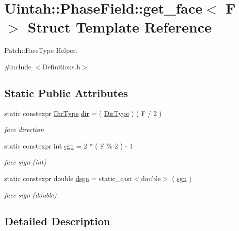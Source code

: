 \hypertarget{structUintah_1_1PhaseField_1_1get__face}{}\section{Uintah\+:\+:Phase\+Field\+:\+:get\+\_\+face$<$ F $>$ Struct Template Reference}
\label{structUintah_1_1PhaseField_1_1get__face}


Patch\+::\+Face\+Type Helper.  




{\ttfamily \#include $<$Definitions.\+h$>$}

\subsection*{Static Public Attributes}
\begin{DoxyCompactItemize}
\item 
static constexpr \hyperlink{namespaceUintah_1_1PhaseField_a94555da848596a419ae2c0e32649e1dc}{Dir\+Type} \hyperlink{structUintah_1_1PhaseField_1_1get__face_ad9ba7a557252042a35b38103270ab337}{dir} = ( \hyperlink{namespaceUintah_1_1PhaseField_a94555da848596a419ae2c0e32649e1dc}{Dir\+Type} ) ( F / 2 )
\begin{DoxyCompactList}\small\item\em face direction \end{DoxyCompactList}\item 
static constexpr int \hyperlink{structUintah_1_1PhaseField_1_1get__face_a55e98edca4379a745b28aa34f1d530a2}{sgn} = 2 $\ast$ ( F \% 2 ) -\/ 1
\begin{DoxyCompactList}\small\item\em face sign (int) \end{DoxyCompactList}\item 
static constexpr double \hyperlink{structUintah_1_1PhaseField_1_1get__face_a8a9bcbabfa59c782a7c0ea0d55d85673}{dsgn} = static\+\_\+cast$<$double$>$ ( \hyperlink{structUintah_1_1PhaseField_1_1get__face_a55e98edca4379a745b28aa34f1d530a2}{sgn} )
\begin{DoxyCompactList}\small\item\em face sign (double) \end{DoxyCompactList}\end{DoxyCompactItemize}


\subsection{Detailed Description}
